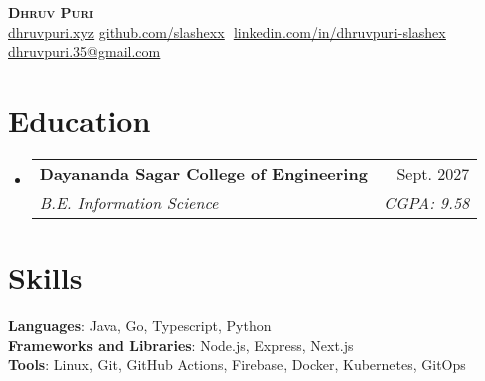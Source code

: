 \documentclass[letterpaper,11pt]{article}
\makeatletter
\newcommand{\resumeSubheading}[4]{
  \vspace{-2pt}\item
    \begin{tabular*}{0.97\textwidth}[t]{l@{\extracolsep{\fill}}r}
      \textbf{#1} & #2 \\
      \textit{\small#3} & \textit{\small #4} \\
    \end{tabular*}\vspace{-7pt}
}
\newcommand{\resumeSubHeadingListStart}{\begin{itemize}[leftmargin=0.15in, label={}]}
\newcommand{\resumeSubHeadingListEnd}{\end{itemize}}
\makeatother
\begin{document}
\begin{flushright}
  \color{gray}
  \item
\end{flushright}

\vspace{-8pt}

\begin{center}
    \textbf{\Huge \scshape Dhruv Puri} \\ \vspace{8pt}
    \small 
    \href{https://dhruvpuri.xyz/}
    {\underline{dhruvpuri.xyz}}
    \href{https://github.com/slashexx}{\underline{github.com/slashexx}} $  $
    \href{https://linkedin.com/in/dhruvpuri-slashex}{\underline{linkedin.com/in/dhruvpuri-slashex}} $  $
    \href{mailto:dhruvpuri.35@gmail.com}
    {\underline{dhruvpuri.35@gmail.com}}
    
\end{center}

\section{Education}
  \resumeSubHeadingListStart
  
    \resumeSubheading
      {Dayananda Sagar College of Engineering}{Sept. 2027}
      {B.E. Information Science}{CGPA: 9.58}
  \resumeSubHeadingListEnd
\section{Skills}
 \begin{itemize}[leftmargin=0.15in, label={}]
    \small{\item{
    
     \textbf{Languages}{: Java, Go, Typescript, Python} \\
     \textbf{Frameworks and Libraries}{: Node.js, Express, Next.js} \\
     
     \textbf{Tools}{: Linux, Git, GitHub Actions, Firebase, Docker, Kubernetes, GitOps}     
     
    }}
 \end{itemize}
 \vspace{-16pt}
 
\end{document}
